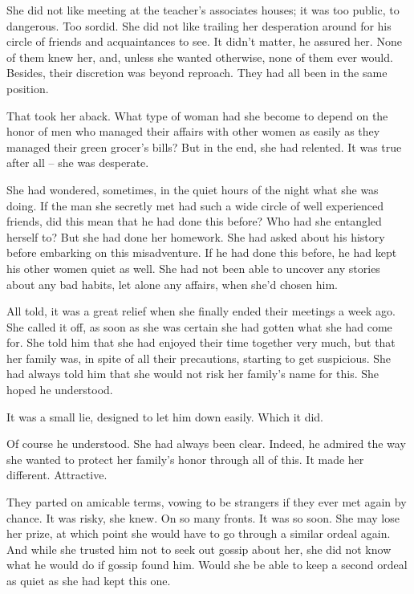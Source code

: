 \documentclass{article}
\newcommand{\egnote}{\todo[color=violet!30]}
\begin{document}
She did not like meeting at the teacher's associates houses; it was too public, to dangerous. Too sordid. She did not like trailing her desperation around for his circle of friends and acquaintances to see. It didn't matter, he assured her. None of them knew her, and, unless she wanted otherwise, none of them ever would. Besides, their discretion was beyond reproach. They had all been in the same position. 

That took her aback. What type of woman had she become to depend on the honor of men who managed their affairs with other women as easily as they managed their green grocer's bills? But in the end, she had relented. It was true after all -- she was desperate.  

She had wondered, sometimes, in the quiet hours of the night what she was doing. If the man she secretly met had such a wide circle of well experienced friends, did this mean that he had done this before? Who had she entangled herself to\egnote{with?}? But she had done her homework. She had asked about his history before embarking on this misadventure. If he had done this before, he had kept his other women quiet as well. She had not been able to uncover any stories about any bad habits, let alone any affairs, when she'd chosen him.

All told, it was a great relief when she finally ended their meetings a week ago. She called it off, as soon as she was certain she had gotten what she had come for. She told him that she had enjoyed their time together very much, but that her family was, in spite of all their precautions, starting to get suspicious. She had always told him that she would not risk her family's name for this. She hoped he understood. 

It was a small lie, designed to let him down easily. Which it did.

Of course he understood. She had always been clear. Indeed, he admired the way she wanted to protect her family's honor through all of this. It made her different. Attractive. 

They parted on amicable terms, vowing to be strangers if they ever met again by chance. It was risky, she knew. On so many fronts. It was so soon. She may\egnote{might} lose her prize, at which point she would have to go through a similar ordeal again. And while she trusted him not to seek out gossip about her, she did not know what he would do if gossip found him. Would she be able to keep a second ordeal as quiet as she had kept this one. 
\end{document}
